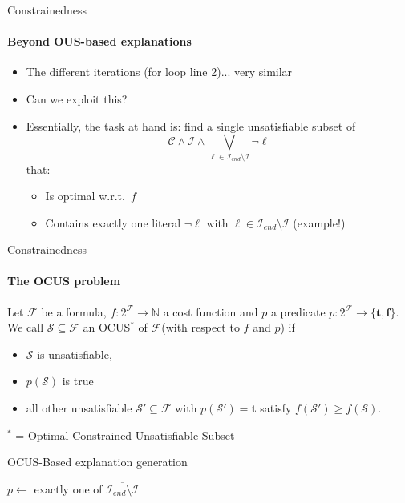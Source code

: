 \documentclass{beamer}
\newcommand\m[1]{\ensuremath{\mathcal{#1}}\xspace}
\newcommand\formula{\ensuremath{\m{F} }\xspace}
\renewcommand\emph[1]{{\color{vuborange}#1}}
\newcommand\Iend{\m{I_{\mathit{end}}}}
\newcommand\nat{\m{\mathbb{N}}}
\newcommand\subsetT{\m{\mathcal{S}}}
\newcommand\ltrue{\m{\textbf{t}}}
\newcommand\lfalse{\m{\textbf{f}}}
\newcommand\call[1]{\m{\textsc{#1}}}
\begin{document}
\begin{frame}{Constrainedness}
	\framesubtitle{Beyond OUS-based explanations}
	\begin{itemize}
		\item The different iterations (for loop line 2)... very similar
		\item Can we exploit this? 
		\pause
		\item Essentially, the task at hand is: find a single unsatisfiable subset of 
		\[\m{C} \land \m{I} \land \bigvee_{\ell\in \Iend\setminus \m{I}}\lnot \ell\]
		that:
		\begin{itemize}
			\item Is optimal w.r.t.\ $f$
			\item Contains \emph{exactly one} literal $\lnot \ell$ with $\ell \in \Iend\setminus \m{I} $ (\emph{example!})
		\end{itemize}
		
	\end{itemize}	
\end{frame}
% 
\begin{frame}{Constrainedness}
	\framesubtitle{The OCUS problem}
	\begin{definition}
			\small
		Let $\formula$ be a formula, $f:2^{\formula} \to \nat$ a cost function and  $p$ a predicate $p: 2^{\formula}\to \{\ltrue,\lfalse\}$. We call %
		$\subsetT \subseteq \formula$ an \emph{OCUS}$^*$ of \formula (with respect to $f$ and $p$) if \begin{itemize}                                      
			\item $\subsetT$ is unsatisfiable,
			\item $p(\subsetT)$ is true
			\item \emph{all other unsatisfiable $\subsetT'\subseteq \formula$ with $p(\subsetT')=\ltrue$ satisfy $f(\subsetT')\geq f(\subsetT)$}.
		\end{itemize}
	\end{definition}
	$^*$ = Optimal \emph{Constrained} Unsatisfiable Subset
\end{frame}


\newcommand\onestepo{\ensuremath{\call{explain-One-Step-ocus}}\xspace}
\begin{frame}{OCUS-Based explanation generation}
	\begin{algorithm}[H]
		\DontPrintSemicolon
		\caption{$\onestepo(\m{C},f,\m{I},\Iend)$}
		\label{alg:oneStepOCUS}
		$p \leftarrow$ exactly one of $\overline{\Iend\setminus \m{I}}$\;
		\Return{$\call{OCUS}(\m{C}\land \m{I}\land \overline{\Iend\setminus \m{I}}, f, p)$} 
	\end{algorithm}
\end{frame}
\end{document}
